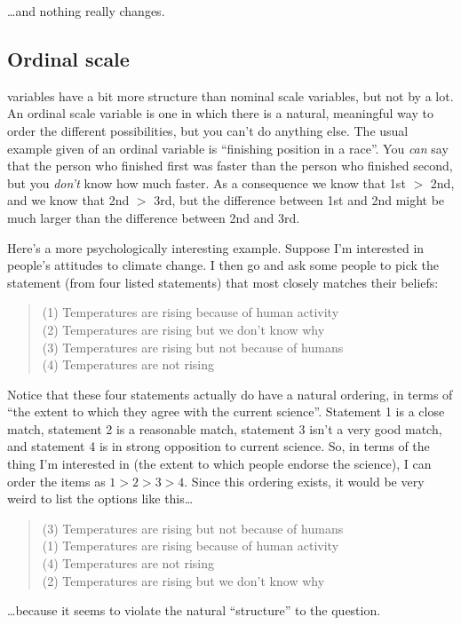 \noindent
\ldots and nothing really changes.

\subsection{Ordinal scale}

 variables have a bit more structure than nominal scale variables, but not by a lot. An ordinal scale variable is one in which there is a natural, meaningful way to order the different possibilities, but you can't do anything else. The usual example given of an ordinal variable is ``finishing position in a race''. You {\it can} say that the person who finished first was faster than the person who finished second, but you {\it don't} know how much faster. As a consequence we know that 1st $>$ 2nd, and we know that 2nd $>$ 3rd, but the difference between 1st and 2nd might be much larger than the difference between 2nd and 3rd.

Here's a more psychologically interesting example. Suppose I'm interested in people's attitudes to climate change. I then go and ask some people to pick the statement (from four listed statements) that most closely matches their beliefs:

\begin{quote}
(1) Temperatures are rising because of human activity \\
(2) Temperatures are rising but we don't know why \\
(3) Temperatures are rising but not because of humans \\
(4) Temperatures are not rising
\end{quote}

Notice that these four statements actually do have a natural ordering, in terms of ``the extent to which they agree with the current science''. Statement 1 is a close match, statement 2 is a reasonable match, statement 3 isn't a very good match, and statement 4 is in strong opposition to current science. So, in terms of the thing I'm interested in (the extent to which people endorse the science), I can order the items as $1 > 2 > 3 > 4$. Since this ordering exists,  it would be very weird to list the options like this\ldots
\begin{quote}
(3) Temperatures are rising but not because of humans \\
(1) Temperatures are rising because of human activity \\
(4) Temperatures are not rising\\
(2) Temperatures are rising but we don't know why 
\end{quote}
\ldots because it seems to violate the natural ``structure'' to the question. 

